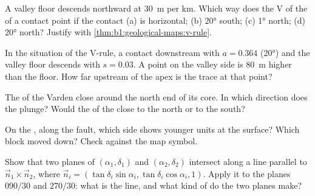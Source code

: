 \begin{exercise}[$\star\star$]\label{exo:b1:geological-maps:6}
A valley floor descends northward at \qty{30}{m} per km. Which way does the
V of the  of a contact point if the contact (a) is horizontal; (b)
 \ang{20} south; (c)  \ang{1} north; (d)  \ang{20} north? Justify
with \cref{thm:b1:geological-maps:v-rule}.
\end{exercise}

\begin{exercise}[$\star\star$]\label{exo:b1:geological-maps:7}
In the situation of the V-rule, a contact  downstream with $a = 0.364$
(\ang{20}) and the valley floor descends with $s = 0.03$. A point on the
valley side is \qty{80}{m} higher than the floor. How far upstream of the
apex is the trace at that point?
\end{exercise}

\begin{exercise}[$\star\star$]\label{exo:b1:geological-maps:8}
The  of the Varden  close around the north end of its core.
In which direction does the  plunge? Would the  of the
 close to the north or to the south?
\end{exercise}

\begin{exercise}[$\star\star$]\label{exo:b1:geological-maps:9}
On the , along the fault, which side shows younger units at
the surface? Which block moved down? Check against the map symbol.
\end{exercise}

\begin{exercise}[$\star\star\star$]\label{exo:b1:geological-maps:10}
Show that two planes of  $(\alpha_1, \delta_1)$ and
$(\alpha_2, \delta_2)$ intersect along a line parallel to
$\vec n_1 \times \vec n_2$, where $\vec n_i = (\tan\delta_i\sin\alpha_i,
\tan\delta_i\cos\alpha_i, 1)$. Apply it to the planes $090/30$ and $270/30$:
what is the line, and what kind of  do the two planes make?
\end{exercise}

